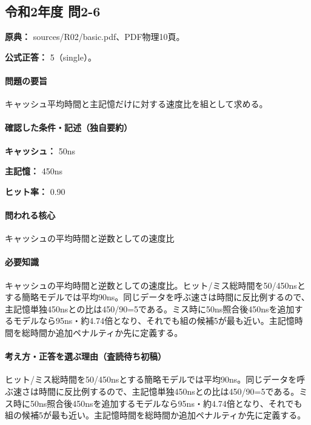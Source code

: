 \subsection{令和2年度 問2-6}
\label{q:r02-reg-basic-2-6}

\noindent\textbf{原典：} sources/R02/basic.pdf、PDF物理10頁。

\textbf{公式正答：} 5（single）。

\paragraph{問題の要旨} キャッシュ平均時間と主記憶だけに対する速度比を組として求める。

\paragraph{確認した条件・記述（独自要約）}\mbox{}\par

\noindent\textbf{キャッシュ：} 50ns\par

\noindent\textbf{主記憶：} 450ns\par

\noindent\textbf{ヒット率：} 0.90\par

\paragraph{問われる核心} キャッシュの平均時間と逆数としての速度比

\paragraph{必要知識} キャッシュの平均時間と逆数としての速度比。ヒット/ミス総時間を50/450nsとする簡略モデルでは平均90ns。同じデータを呼ぶ速さは時間に反比例するので、主記憶単独450nsとの比は450/90=\allowbreak{}5である。ミス時に50ns照合後450nsを追加するモデルなら95ns・約4.74倍となり、それでも組の候補5が最も近い。主記憶時間を総時間か追加ペナルティか先に定義する。

\paragraph{考え方・正答を選ぶ理由（査読待ち初稿）} ヒット/ミス総時間を50/450nsとする簡略モデルでは平均90ns。同じデータを呼ぶ速さは時間に反比例するので、主記憶単独450nsとの比は450/90=\allowbreak{}5である。ミス時に50ns照合後450nsを追加するモデルなら95ns・約4.74倍となり、それでも組の候補5が最も近い。主記憶時間を総時間か追加ペナルティか先に定義する。

